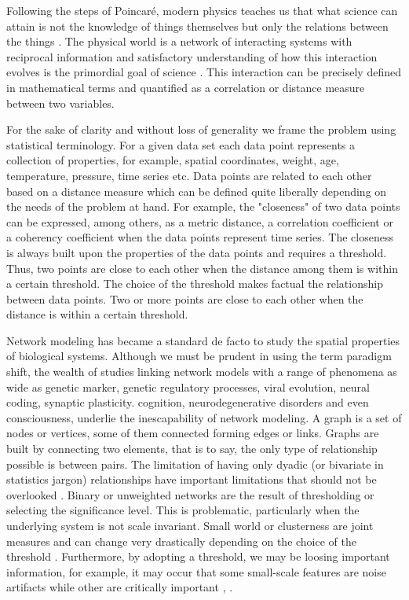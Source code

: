 \documentclass[onecollarge,runningheads]{svjour2}
\begin{document}
Following the steps of Poincar{\'e}, modern physics teaches us that what science can attain is not the knowledge of things themselves but only the relations between the things \cite{Poincare:1952}. The physical world is a network of interacting systems with reciprocal information and satisfactory understanding of how this interaction evolves is the primordial goal of science \cite{rovelli2015relative}.
This interaction can be precisely defined in mathematical terms and quantified as a correlation or distance measure between two variables.

For the sake of clarity and without loss of generality we frame the problem using statistical terminology.
For a given data set each data point represents a collection of properties, for example, spatial coordinates, weight, age, temperature, pressure, time series etc. Data points are related to each other based on a distance measure which can be defined quite liberally depending on the needs of the problem at hand. For example, the "closeness" of two data points can be expressed, among others, as a metric distance, a correlation coefficient or a coherency coefficient when the data points represent time series.
The closeness is always built upon the properties of the data points and requires a threshold. Thus, two points are close to each other when the distance among them is within a certain threshold. The choice of the threshold makes factual the relationship between data points. Two or more points are close to each other when the distance is within a certain threshold.

Network modeling has became a standard de facto to study the spatial properties of biological systems. 
Although we must be prudent in using the term paradigm shift, the wealth of studies linking network models with a range of phenomena as wide as genetic marker, genetic regulatory processes, viral evolution, neural coding, synaptic plasticity. cognition, neurodegenerative disorders and even consciousness, underlie the inescapability of network modeling.  
A graph is a set of nodes or vertices, some of them connected forming edges or links. Graphs are built by connecting two elements, that is to say, the only type of relationship possible is between pairs. The limitation of having only dyadic (or bivariate in statistics jargon) relationships have important limitations that should not be overlooked \cite{giusti2016two} .
Binary or unweighted networks are the result of thresholding or selecting the significance level. This is problematic, particularly when the underlying system is not scale invariant. Small world or clusterness are joint measures and can change very drastically depending on the choice of the threshold \cite{toppi2012statistica}. Furthermore, by adopting a threshold, we may be loosing important information, for example, it may occur that some small-scale features are noise artifacts while other are critically important \cite{fallani2014graph}, \cite{papo2014complex}.
\end{document}
